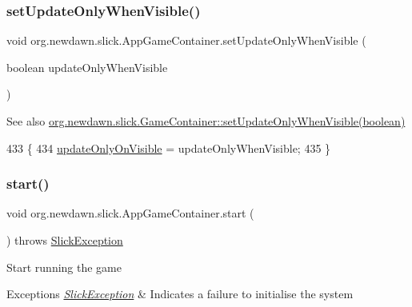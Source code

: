 \subsubsection{\texorpdfstring{set\+Update\+Only\+When\+Visible()}{setUpdateOnlyWhenVisible()}}
{\footnotesize\ttfamily void org.\+newdawn.\+slick.\+App\+Game\+Container.\+set\+Update\+Only\+When\+Visible (\begin{DoxyParamCaption}\item[{boolean}]{update\+Only\+When\+Visible }\end{DoxyParamCaption})\hspace{0.3cm}{\ttfamily [inline]}}

\begin{DoxySeeAlso}{See also}
\mbox{\hyperlink{classorg_1_1newdawn_1_1slick_1_1_game_container_a9e04385f8de0ccfad5ed732e7ae11f4f}{org.\+newdawn.\+slick.\+Game\+Container\+::set\+Update\+Only\+When\+Visible(boolean)}} 
\end{DoxySeeAlso}

\begin{DoxyCode}
433                                                                         \{
434         \mbox{\hyperlink{classorg_1_1newdawn_1_1slick_1_1_app_game_container_a8ed58465ae60f67d13fa69ea7929d3ef}{updateOnlyOnVisible}} = updateOnlyWhenVisible;
435     \}
\end{DoxyCode}
\mbox{\label{classorg_1_1newdawn_1_1slick_1_1_app_game_container_adcadc0e560e64d03be24c817931fdd54}} 
\subsubsection{\texorpdfstring{start()}{start()}}
{\footnotesize\ttfamily void org.\+newdawn.\+slick.\+App\+Game\+Container.\+start (\begin{DoxyParamCaption}{ }\end{DoxyParamCaption}) throws \mbox{\hyperlink{classorg_1_1newdawn_1_1slick_1_1_slick_exception}{Slick\+Exception}}\hspace{0.3cm}{\ttfamily [inline]}}

Start running the game


\begin{DoxyExceptions}{Exceptions}
{\em \mbox{\hyperlink{classorg_1_1newdawn_1_1slick_1_1_slick_exception}{Slick\+Exception}}} & Indicates a failure to initialise the system \\
\hline
\end{DoxyExceptions}

